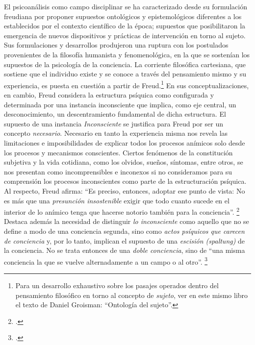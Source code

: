El psicoanálisis como campo disciplinar se ha caracterizado desde su formulación freudiana por proponer supuestos ontológicos y epistemológicos diferentes a los establecidos por el contexto científico de la época; supuestos que posibilitaron la emergencia de nuevos dispositivos y prácticas de intervención en torno al sujeto. Sus formulaciones y desarrollos produjeron una ruptura con los postulados provenientes de la filosofía humanista y fenomenológica, en la que se sostenían los supuestos de la psicología de la conciencia. La corriente filosófica cartesiana, que sostiene que el individuo existe y se conoce a través del pensamiento mismo y su experiencia, es puesta en cuestión a partir de Freud.\footnote{Para un desarrollo exhaustivo sobre los pasajes operados dentro del pensamiento filosófico en torno al concepto de \emph{sujeto}, ver en este mismo libro el texto de Daniel Groisman: \enquote{Ontología del sujeto}.} En sus conceptualizaciones, en cambio, Freud considera la estructura psíquica como configurada y determinada por una instancia inconsciente que implica, como eje central, un desconocimiento, un descentramiento fundamental de dicha estructura. El supuesto de una instancia \emph{Inconsciente} se justifica para Freud por ser un concepto \emph{necesario}. Necesario en tanto la experiencia misma nos revela las limitaciones e imposibilidades de explicar todos los procesos anímicos solo desde los procesos y mecanismos conscientes. Ciertos fenómenos de la constitución subjetiva y la vida cotidiana, como los olvidos, sueños, síntomas, entre otros, se nos presentan como incomprensibles e inconexos si no consideramos para su comprensión los procesos inconscientes como parte de la estructuración psíquica. Al respecto, Freud afirma: \enquote{Es preciso, entonces, adoptar ese punto de vista: No es más que una \emph{presunción insostenible} exigir que todo cuanto sucede en el interior de lo anímico tenga que hacerse notorio también para la conciencia}. \footcite[][163]{@7031-FREUD2008} Destaca además la necesidad de distinguir \emph{lo inconsciente} como aquello que no se define a modo de una conciencia segunda, sino como \emph{actos psíquicos que carecen de conciencia} y, por lo tanto, implican el supuesto de una \emph{escisión (spaltung)} de la conciencia. No se trata entonces de una \emph{doble conciencia}, sino de \enquote{una misma conciencia la que se vuelve alternadamente a un campo o al otro}. \footcite[][167]{@7031-FREUD2008}

